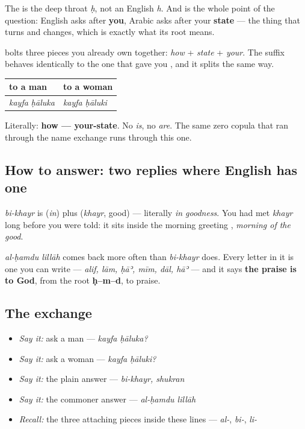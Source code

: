 The \textbf{} is the deep throat \emph{ḥ}, not an English \emph{h}. And \textbf{} is the whole point of the question: English asks after \textbf{you}, Arabic asks after your \textbf{state} — the thing that turns and changes, which is exactly what its root means.

\begin{grammarlens}[title={Grammar Lens: the same suffix, one lesson on}]
\textbf{ } bolts three pieces you already own together: \emph{how} + \emph{state} + \emph{your}. The suffix behaves identically to the one that gave you \textbf{}, and it splits the same way.

\noindent
\begin{tabularx}{\linewidth}{@{}>{\raggedright\arraybackslash}X>{\raggedright\arraybackslash}X@{}}
\toprule
\textbf{to a man} & \textbf{to a woman} \\
\midrule
\textbf{\ar{كيف} \ar{حالك؟}} \emph{kayfa ḥāluka} & \textbf{\ar{كيف} \ar{حالك؟}} \emph{kayfa ḥāluki} \\
\bottomrule
\end{tabularx}

Literally: \textbf{how — your-state}. No \emph{is}, no \emph{are}. The same zero copula that ran through the name exchange runs through this one.
\end{grammarlens}

\subsection*{How to answer: two replies where English has one}
\textbf{} \emph{bi-khayr} is \textbf{} (\emph{in}) plus \textbf{} (\emph{khayr}, good) — literally \emph{in goodness}. You had met \emph{khayr} long before you were told: it sits inside the morning greeting \textbf{ }, \emph{morning of the good}.

\emph{al-ḥamdu lillāh} comes back more often than \emph{bi-khayr} does. Every letter in it is one you can write — \emph{alif, lām, ḥāʾ, mīm, dāl, hāʾ} — and it says \textbf{the praise is to God}, from the root \textbf{ḥ–m–d}, to praise.

\subsection*{The exchange}
\begin{itemize}
\raggedright
  \item \emph{Say it:} ask a man — \emph{kayfa ḥāluka?}
  \item \emph{Say it:} ask a woman — \emph{kayfa ḥāluki?}
  \item \emph{Say it:} the plain answer — \emph{bi-khayr, shukran}
  \item \emph{Say it:} the commoner answer — \emph{al-ḥamdu lillāh}
  \item \emph{Recall:} the three attaching pieces inside these lines — \emph{al-}, \emph{bi-}, \emph{li-}
\end{itemize}

